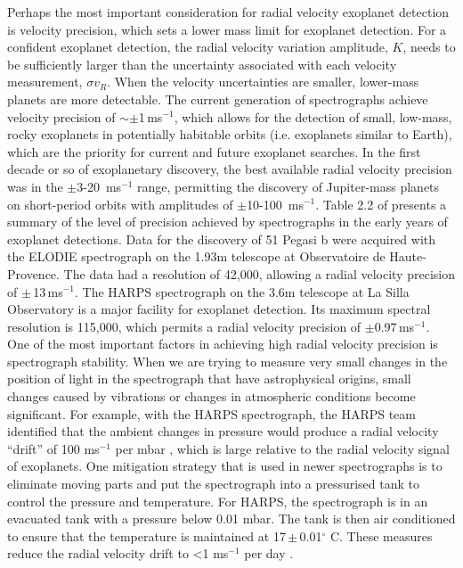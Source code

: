 Perhaps the most important consideration for radial velocity exoplanet detection is velocity precision, which sets a lower mass limit for exoplanet detection. For a confident exoplanet detection, the radial velocity variation amplitude, $K$, needs to be sufficiently larger than the uncertainty associated with each velocity measurement, $\sigma v_{R}$. When the velocity uncertainties are smaller, lower-mass planets are more detectable. The current generation of spectrographs achieve velocity precision of $\sim \pm$1\,ms$^{-1}$, which allows for the detection of small, low-mass, rocky exoplanets in potentially habitable orbits (i.e. exoplanets similar to Earth), which are the priority for current and future exoplanet searches. In the first decade or so of exoplanetary discovery, the best available radial velocity precision was in the $\pm$3-20~ms$^{-1}$ range, permitting the discovery of Jupiter-mass planets on short-period orbits with amplitudes of $\pm$10-100~ms$^{-1}$. Table 2.2 of \citet{2011Perryman} presents a summary of the level of precision achieved by spectrographs in the early years of exoplanet detections. Data for the discovery of 51 Pegasi b \citep{1995Mayor} were acquired with the ELODIE spectrograph \citep{1996Baranne} on the 1.93m telescope at Observatoire de Haute-Provence. The data had a resolution of 42,000, allowing a radial velocity precision of $\pm$\,13\,ms$^{-1}$. The HARPS spectrograph on the 3.6m telescope at La Silla Observatory is a major facility for exoplanet detection. Its maximum spectral resolution is 115,000, which permits a radial velocity precision of $\pm$0.97\,ms$^{-1}$.\\

One of the most important factors in achieving high radial velocity precision is spectrograph stability. When we are trying to measure very small changes in the position of light in the spectrograph that have astrophysical origins, small changes caused by vibrations or changes in atmospheric conditions become significant. For example, with the HARPS spectrograph, the HARPS team identified that the ambient changes in pressure would produce a radial velocity ``drift'' of 100 ms$^{-1}$ per mbar \citep{HARPS}, which is large relative to the radial velocity signal of exoplanets. One mitigation strategy that is used in newer spectrographs is to eliminate moving parts and put the spectrograph into a pressurised tank to control the pressure and temperature. For HARPS, the spectrograph is in an evacuated tank with a pressure below 0.01 mbar. The tank is then air conditioned to ensure that the temperature is maintained at 17\,$\pm$\,0.01$^{\circ}$ C. These measures reduce the radial velocity drift to \textless1 ms$^{-1}$ per day \citealt{2003Mayor}.\\

